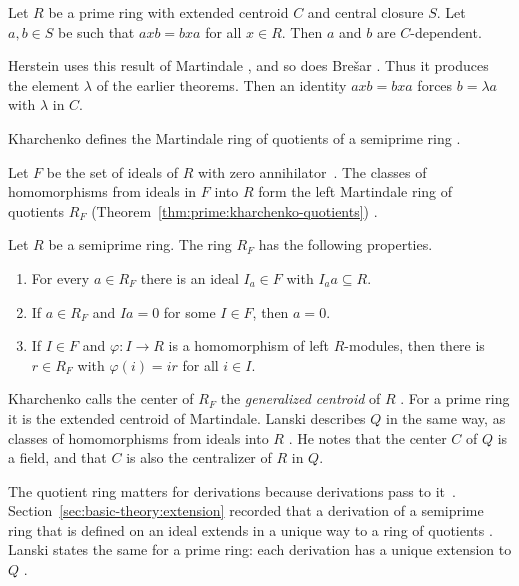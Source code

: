 \begin{theorem}\label{thm:prime:martindale-dependent}
Let $R$ be a prime ring with extended centroid $C$ and central closure $S$.
Let $a,b\in S$ be such that $axb=bxa$ for all $x\in R$. Then $a$ and $b$ are
$C$-dependent.
\end{theorem}

Herstein uses this result of Martindale \cite[p.~510]{Herstein1979}, and so
does Bre\v{s}ar \cite[p.~387]{Bresar1993}. Thus it produces the element
$\lambda$ of the earlier theorems. Then an identity $axb=bxa$ forces
$b=\lambda a$ with $\lambda$ in $C$.

Kharchenko defines the Martindale ring of quotients of a semiprime ring
\cite[Section~1.4, p.~19]{Kharchenko1991}.

Let $F$ be the set of ideals of $R$ with zero annihilator~\cite[1.4.8,
p.~21]{Kharchenko1991}. The classes of
homomorphisms from ideals in $F$ into $R$ form the left Martindale ring of
quotients $R_F$ (Theorem~\ref{thm:prime:kharchenko-quotients}) \cite[1.4.8,
p.~21]{Kharchenko1991}.

\begin{theorem}\label{thm:prime:kharchenko-quotients}
Let $R$ be a semiprime ring. The ring $R_F$ has the following properties.
\begin{enumerate}
\item For every $a\in R_F$ there is an ideal $I_a\in F$ with $I_aa\subseteq R$.
\item If $a\in R_F$ and $Ia=0$ for some $I\in F$, then $a=0$.
\item If $I\in F$ and $\varphi\colon I\to R$ is a homomorphism of left
$R$-modules, then there is $r\in R_F$ with $\varphi(i)=ir$ for all $i\in I$.
\end{enumerate}
\end{theorem}

Kharchenko calls the center of $R_F$ the \emph{generalized centroid} of $R$
\cite[1.5.1, p.~24]{Kharchenko1991}. For a prime ring it is the extended
centroid of Martindale. Lanski describes $Q$ in the same way, as classes of
homomorphisms from ideals into $R$ \cite[p.~277]{Lanski1988}. He notes that
the center $C$ of $Q$ is a field, and that $C$ is also the centralizer of $R$
in $Q$.

The quotient ring matters for derivations because derivations pass to it~\cite[p.~277]{Lanski1988}.
Section~\ref{sec:basic-theory:extension} recorded that a derivation of a
semiprime ring that is defined on an ideal extends in a unique way to a ring
of quotients \cite[Proposition~1.8.1, p.~50]{Kharchenko1991}. Lanski states
the same for a prime ring: each derivation has a unique extension to $Q$
\cite[p.~277]{Lanski1988}.

